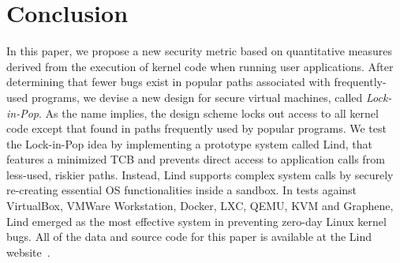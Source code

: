 \section{Conclusion}
\label{sec.conclusion}

In this paper, we propose a new security metric based on quantitative measures derived from
the execution of kernel code when running user applications.
After determining that fewer bugs exist in popular paths associated with frequently-used
programs, we devise a new design for secure virtual machines, called \emph{Lock-in-Pop}.
As the name implies, the design scheme locks out access to all
kernel code except that found in paths frequently used by
popular programs. We test the Lock-in-Pop idea by implementing a prototype system
called Lind, that features a minimized TCB and prevents direct access to application
calls from less-used, riskier paths.
Instead, Lind supports complex system calls by securely re-creating
essential OS functionalities inside a sandbox.
In tests against VirtualBox, VMWare Workstation, Docker, LXC,
QEMU, KVM and Graphene, Lind emerged as the most effective system in preventing
zero-day Linux kernel bugs.
All of the data and source code for this paper is available at the Lind website~\cite{Lind}.
